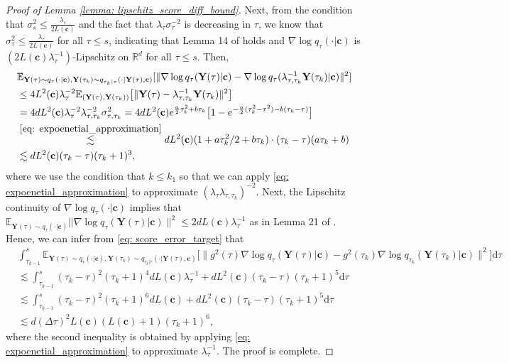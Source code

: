 \documentclass[11pt]{article}
\newcommand{\mE}{\mathbb{E}}
\newcommand{\mR}{\mathbb{R}}
\newcommand{\bY}{\mathbf{Y}}
\newcommand{\bc}{\mathbf{c}}
\newcommand{\intd}{\mathrm{d}}
\begin{document}
\begin{proof}[Proof of Lemma \ref{lemma: lipschitz_score_diff_bound}]
Next, from the condition that $\sigma_{s}^2\le \frac{\lambda_{s}}{2L(\bc)}$ and the fact that $\lambda_\tau\sigma_\tau^{-2}$ is decreasing in $\tau$, we know that $\sigma_{\tau}^2\le \frac{\lambda_{\tau}}{2L(\bc)}$ for all $\tau \le s$, indicating that Lemma 14 of \cite{chen2023improved} holds and $\nabla\log q_\tau(\cdot | \bc)$ is $(2L(\bc)\lambda_\tau^{-1})$-Lipschitz on $\mR^d$ for all $\tau \le s$. Then,
\begin{align*}
    &\mE_{\bY(\tau)\sim q_\tau(\cdot | \bc), \bY(\tau_k)\sim q_{\tau_k | \tau}(\cdot | \bY(\tau), \bc)}[\|\nabla\log q_\tau(\bY(\tau) | \bc) - \nabla\log q_{\tau}(\lambda_{\tau, \tau_k}^{-1}\bY(\tau_k) | \bc)\|^2] \\
    &\le 4L^2(\bc)\lambda_\tau^{-2}\mE_{(\bY(\tau), \bY(\tau_k))} \big[\|\bY(\tau)  - \lambda_{\tau, \tau_k}^{-1} \bY(\tau_k)\|^2\big]\\
    &= 4dL^2(\bc)\lambda_\tau^{-2} \lambda_{\tau,\tau_k}^{-2} \sigma^2_{\tau, \tau_k} = 4d L^2(\bc)e^{\frac{a}{2}\tau_k^2 + b\tau_k}\big[1 - e^{-\frac{a}{2}(\tau_k^2 - \tau^2) - b(\tau_k - \tau)}\big]\\
    &\overset{\eqref{eq: expoenetial_approximation}}{\lesssim} d L^2(\bc)(1 + a\tau_k^2/2 + b\tau_k)\cdot(\tau_k - \tau)(a\tau_k + b) \\
    &\lesssim d L^2(\bc)(\tau_k - \tau)(\tau_k + 1)^3,
\end{align*}
where we use the condition that $k \le k_1$ so that we can apply \eqref{eq: expoenetial_approximation} to approximate $(\lambda_\tau \lambda_{\tau,\tau_k})^{-2}$. Next, the Lipschitz continuity of $\nabla\log q_\tau(\cdot | \bc)$ implies that $\mE_{\bY(\tau)\sim q_\tau(\cdot | \bc)}||\nabla\log q_\tau(\bY(\tau) | \bc)\|^2 \le 2dL(\bc)\lambda_\tau^{-1}$ as in Lemma 21 of \cite{chen2023improved}. Hence, we can infer from \eqref{eq: score_error_target} that
\begin{align*}
    & \int_{\tau_{k - 1}}^{s}\mE_{\bY(\tau)\sim q_\tau(\cdot | \bc), \bY(\tau_k)\sim q_{\tau_k | \tau}(\cdot | \bY(\tau), \bc)}\big[\|g^2(\tau)\nabla\log q_\tau(\bY(\tau) | \bc) - g^2(\tau_k)\nabla\log q_{\tau_k}(\bY(\tau_k) | \bc)\|^2\big]\intd \tau \\
    &\lesssim \int_{\tau_{k - 1}}^{s}(\tau_k - \tau)^2(\tau_k + 1)^4 dL(\bc)\lambda_\tau^{-1} + d L^2(\bc)(\tau_k - \tau)(\tau_k + 1)^5 \intd \tau\\
    &\lesssim \int_{\tau_{k - 1}}^{s}(\tau_k - \tau)^2(\tau_k + 1)^6 dL(\bc) + d L^2(\bc)(\tau_k - \tau)(\tau_k + 1)^5 \intd \tau\\
    &\lesssim d(\Delta\tau)^2L(\bc)(L(\bc) + 1)(\tau_k + 1)^6,
\end{align*}
where the second inequality is obtained by applying \eqref{eq: expoenetial_approximation} to approximate $\lambda_\tau^{-1}$. The proof is complete.
\end{proof}
\end{document}
